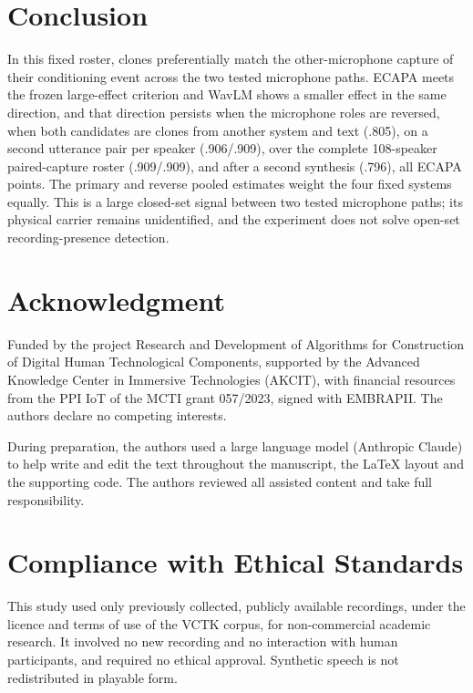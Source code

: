 \documentclass[10pt,twocolumn,letterpaper]{article}
\begin{document}
\section{Conclusion}
In this fixed roster, clones preferentially match the other-microphone capture
of their conditioning event across the two tested microphone paths. ECAPA meets
the frozen large-effect criterion and WavLM shows a smaller effect in the same
direction, and that direction persists when the microphone roles are reversed, when both
candidates are clones from another system and text (.805), on a second
utterance pair per speaker (.906/.909), over the complete 108-speaker
paired-capture roster (.909/.909), and after a second synthesis (.796), all
ECAPA points. The primary and
reverse pooled estimates weight the four fixed systems equally. This is a large closed-set signal between two
tested microphone paths; its physical carrier remains unidentified, and the
experiment does not solve open-set recording-presence detection.

\section{Acknowledgment}
Funded by the project Research and Development of Algorithms for Construction of
Digital Human Technological Components, supported by the Advanced Knowledge
Center in Immersive Technologies (AKCIT), with financial resources from the PPI
IoT of the MCTI grant 057/2023, signed with EMBRAPII. The authors declare no
competing interests.

During preparation, the authors used a large language model (Anthropic Claude)
to help write and edit the text throughout the manuscript, the LaTeX layout and
the supporting code. The
authors reviewed all assisted content and take full responsibility.

\section{Compliance with Ethical Standards}
This study used only previously collected, publicly available recordings, under
the licence and terms of use of the VCTK corpus, for non-commercial academic
research. It involved no new recording and no interaction with human
participants, and required no ethical approval. Synthetic speech is not
redistributed in playable form.

\let\oldthebibliography\thebibliography
\renewcommand{\thebibliography}[1]{\oldthebibliography{#1}%
  \setlength{\itemsep}{0pt}\setlength{\parsep}{0pt}\setlength{\topsep}{2pt}}
{\small


}
\end{document}
